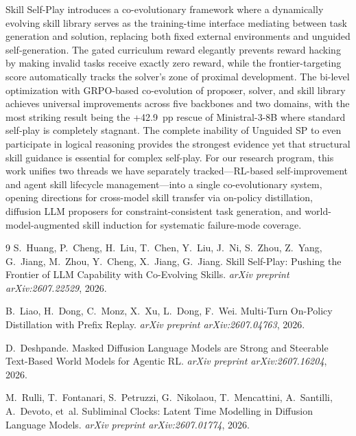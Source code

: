 \documentclass[11pt,a4paper]{article}
\begin{document}
Skill Self-Play introduces a co-evolutionary framework where a dynamically evolving skill library serves as the training-time interface mediating between task generation and solution, replacing both fixed external environments and unguided self-generation. The gated curriculum reward elegantly prevents reward hacking by making invalid tasks receive exactly zero reward, while the frontier-targeting score automatically tracks the solver's zone of proximal development. The bi-level optimization with GRPO-based co-evolution of proposer, solver, and skill library achieves universal improvements across five backbones and two domains, with the most striking result being the +42.9~pp rescue of Ministral-3-8B where standard self-play is completely stagnant. The complete inability of Unguided SP to even participate in logical reasoning provides the strongest evidence yet that structural skill guidance is essential for complex self-play. For our research program, this work unifies two threads we have separately tracked---RL-based self-improvement and agent skill lifecycle management---into a single co-evolutionary system, opening directions for cross-model skill transfer via on-policy distillation, diffusion LLM proposers for constraint-consistent task generation, and world-model-augmented skill induction for systematic failure-mode coverage.


\begin{thebibliography}{9}
S.~Huang, P.~Cheng, H.~Liu, T.~Chen, Y.~Liu, J.~Ni, S.~Zhou, Z.~Yang, G.~Jiang, M.~Zhou, Y.~Cheng, X.~Jiang, G.~Jiang.
\newblock Skill Self-Play: Pushing the Frontier of LLM Capability with Co-Evolving Skills.
\newblock \emph{arXiv preprint arXiv:2607.22529}, 2026.

B.~Liao, H.~Dong, C.~Monz, X.~Xu, L.~Dong, F.~Wei.
\newblock Multi-Turn On-Policy Distillation with Prefix Replay.
\newblock \emph{arXiv preprint arXiv:2607.04763}, 2026.

D.~Deshpande.
\newblock Masked Diffusion Language Models are Strong and Steerable Text-Based World Models for Agentic RL.
\newblock \emph{arXiv preprint arXiv:2607.16204}, 2026.

M.~Rulli, T.~Fontanari, S.~Petruzzi, G.~Nikolaou, T.~Mencattini, A.~Santilli, A.~Devoto, et~al.
\newblock Subliminal Clocks: Latent Time Modelling in Diffusion Language Models.
\newblock \emph{arXiv preprint arXiv:2607.01774}, 2026.
\end{thebibliography}
\end{document}
